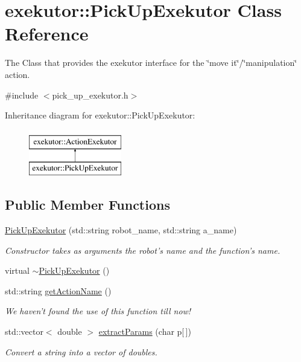 \hypertarget{classexekutor_1_1PickUpExekutor}{\section{exekutor\-:\-:\-Pick\-Up\-Exekutor \-Class \-Reference}
\label{classexekutor_1_1PickUpExekutor}
}


\-The \-Class that provides the exekutor interface for the \char`\"{}move it\char`\"{}/\char`\"{}manipulation\char`\"{} action.  




{\ttfamily \#include $<$pick\-\_\-up\-\_\-exekutor.\-h$>$}

\-Inheritance diagram for exekutor\-:\-:\-Pick\-Up\-Exekutor\-:\begin{figure}[H]
\begin{center}
\leavevmode
\includegraphics[height=2.000000cm]{classexekutor_1_1PickUpExekutor}
\end{center}
\end{figure}
\subsection*{\-Public \-Member \-Functions}
\begin{DoxyCompactItemize}
\item 
\hyperlink{classexekutor_1_1PickUpExekutor_a22954286bf604efb574d30ddb1f4cd7d}{\-Pick\-Up\-Exekutor} (std\-::string robot\-\_\-name, std\-::string a\-\_\-name)
\begin{DoxyCompactList}\small\item\em \-Constructor takes as arguments the robot's name and the function's name. \end{DoxyCompactList}\item 
virtual \hyperlink{classexekutor_1_1PickUpExekutor_a2b05bbfb6a08f3813a5e58dcdfb4a713}{$\sim$\-Pick\-Up\-Exekutor} ()
\item 
std\-::string \hyperlink{classexekutor_1_1ActionExekutor_a48d170d3931798f4019856fc0f070392}{get\-Action\-Name} ()
\begin{DoxyCompactList}\small\item\em \-We haven't found the use of this function till now! \end{DoxyCompactList}\item 
std\-::vector$<$ double $>$ \hyperlink{classexekutor_1_1ActionExekutor_af8ca9f59f077baad45a8cba4ab774e82}{extract\-Params} (char p\mbox{[}$\,$\mbox{]})
\begin{DoxyCompactList}\small\item\em \-Convert a string into a vector of doubles. \end{DoxyCompactList}\end{DoxyCompactItemize}
